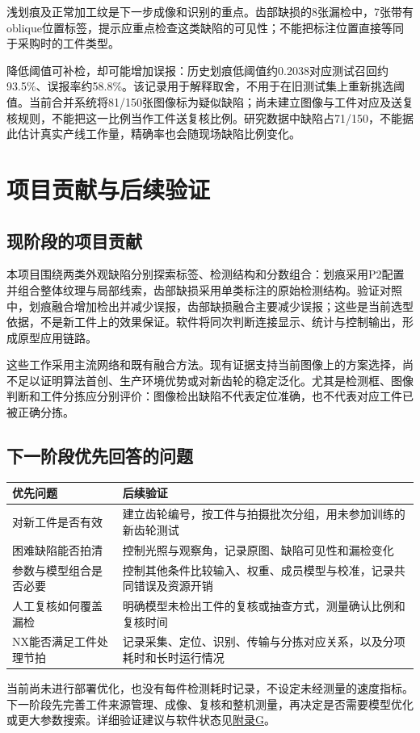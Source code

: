 浅划痕及正常加工纹是下一步成像和识别的重点。齿部缺损的8张漏检中，7张带有oblique位置标签，提示应重点检查这类缺陷的可见性；不能把标注位置直接等同于采购时的工件类型。

降低阈值可补检，却可能增加误报：历史划痕低阈值约0.2038对应测试召回约93.5\%、误报率约58.8\%。该记录用于解释取舍，不用于在旧测试集上重新挑选阈值。当前合并系统将81/150张图像标为疑似缺陷；尚未建立图像与工件对应及送复核规则，不能把这一比例当作工件送复核比例。研究数据中缺陷占71/150，不能据此估计真实产线工作量，精确率也会随现场缺陷比例变化。\cite{ref3}

\FloatBarrier{}\section{项目贡献与后续验证}
\FloatBarrier{}\subsection{现阶段的项目贡献}
本项目围绕两类外观缺陷分别探索标签、检测结构和分数组合：划痕采用P2配置并组合整体纹理与局部线索，齿部缺损采用单类标注的原始检测结构。验证对照中，划痕融合增加检出并减少误报，齿部缺损融合主要减少误报；这些是当前选型依据，不是新工件上的效果保证。软件将同次判断连接显示、统计与控制输出，形成原型应用链路。

这些工作采用主流网络和既有融合方法。现有证据支持当前图像上的方案选择，尚不足以证明算法首创、生产环境优势或对新齿轮的稳定泛化。尤其是检测框、图像判断和工件分拣应分别评价：图像检出缺陷不代表定位准确，也不代表对应工件已被正确分拣。

\FloatBarrier{}\subsection{下一阶段优先回答的问题}

\par\medskip\noindent\begin{minipage}{\linewidth}\small{}
\begin{tabular}{@{}>{\raggedright\arraybackslash}p{0.380\dimexpr\linewidth-2\tabcolsep\relax}>{\raggedright\arraybackslash}p{0.620\dimexpr\linewidth-2\tabcolsep\relax}@{}}
\toprule
优先问题 & 后续验证 \\
\midrule
对新工件是否有效 & 建立齿轮编号，按工件与拍摄批次分组，用未参加训练的新齿轮测试 \\
困难缺陷能否拍清 & 控制光照与观察角，记录原图、缺陷可见性和漏检变化 \\
参数与模型组合是否必要 & 控制其他条件比较输入、权重、成员模型与校准，记录共同错误及资源开销 \\
人工复核如何覆盖漏检 & 明确模型未检出工件的复核或抽查方式，测量确认比例和复核时间 \\
NX能否满足工件处理节拍 & 记录采集、定位、识别、传输与分拣对应关系，以及分项耗时和长时运行情况 \\
\bottomrule\end{tabular}\end{minipage}\par\medskip

当前尚未进行部署优化，也没有每件检测耗时记录，不设定未经测量的速度指标。下一阶段先完善工件来源管理、成像、复核和整机测量，再决定是否需要模型优化或更大参数搜索。详细验证建议与软件状态见\protect\hyperlink{appendix-g}{附录G}。


